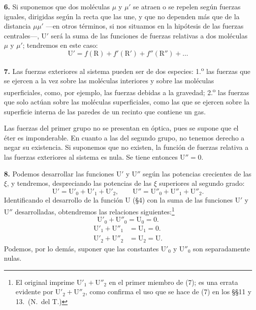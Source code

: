 \noindent\textbf{6.} Si suponemos que dos moléculas $\mu$ y $\mu'$ se
atraen o se repelen según fuerzas iguales, dirigidas según la recta que las
une, y que no dependen más que de la distancia $\mu\mu'$ —en otros
términos, si nos situamos en la hipótesis de las fuerzas centrales—,
$\mathrm{U}'$ será la suma de las funciones de fuerzas relativas a dos
moléculas $\mu$ y $\mu'$; tendremos en este caso:
\begin{equation}
\mathrm{U}'=f(\mathrm{R})+f'(\mathrm{R}')+f''(\mathrm{R}'')+\ldots
\tag{5}
\end{equation}

\noindent\textbf{7.} Las fuerzas exteriores al sistema pueden ser de dos
especies: 1.\textsuperscript{o} las fuerzas que se ejercen a la vez sobre
las moléculas interiores y sobre las moléculas superficiales, como, por
ejemplo, las fuerzas debidas a la gravedad; 2.\textsuperscript{o} las
fuerzas que solo actúan sobre las moléculas superficiales, como las que se
ejercen sobre la superficie interna de las paredes de un recinto que
contiene un gas.

Las fuerzas del primer grupo no se presentan en óptica, pues se supone que
el éter es imponderable. En cuanto a las del segundo grupo, no tenemos
derecho a negar su existencia. Si suponemos que no existen, la función de
fuerzas relativa a las fuerzas exteriores al sistema es nula. Se tiene
entonces $\mathrm{U}''=0$.

\noindent\textbf{8.} Podemos desarrollar las funciones $\mathrm{U}'$ y
$\mathrm{U}''$ según las potencias crecientes de las $\xi$, y tendremos,
despreciando las potencias de las $\xi$ superiores al segundo grado:
\[
\mathrm{U}'=\mathrm{U}'_0+\mathrm{U}'_1+\mathrm{U}'_2,\qquad
\mathrm{U}''=\mathrm{U}''_0+\mathrm{U}''_1+\mathrm{U}''_2.
\]
Identificando el desarrollo de la función $\mathrm{U}$ (§4) con la suma de
las funciones $\mathrm{U}'$ y $\mathrm{U}''$ desarrolladas, obtendremos las
relaciones siguientes:\footnote{El original imprime
$\mathrm{U}'_1+\mathrm{U}''_2$ en el primer miembro de (7); es una errata
evidente por $\mathrm{U}'_2+\mathrm{U}''_2$, como confirma el uso que se hace
de (7) en los §§11 y 13.~(N.~del T.)}
\[
\mathrm{U}'_0+\mathrm{U}''_0=\mathrm{U}_0=0.
\]
\begin{align}
\mathrm{U}'_1+\mathrm{U}''_1&=\mathrm{U}_1=0.\tag{6}\\
\mathrm{U}'_2+\mathrm{U}''_2&=\mathrm{U}_2=\mathrm{U}.\tag{7}
\end{align}
Podemos, por lo demás, suponer que las constantes $\mathrm{U}'_0$ y
$\mathrm{U}''_0$ son separadamente nulas.

